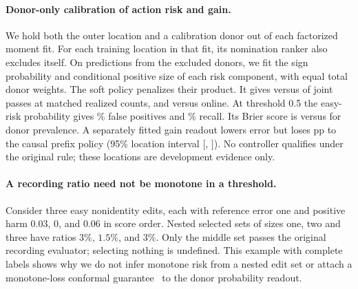 \paragraph{Donor-only calibration of action risk and gain.}
We hold both the outer location and a calibration donor out of each
factorized moment fit. For each training location in that fit, its
nomination ranker also excludes itself. On predictions from the excluded
donors, we fit the sign probability and conditional positive size of
each risk component, with equal total donor weights. The soft policy
penalizes their product. It gives \DonorReadoutMatched{} versus
\DonorReadoutMatchedFactor{} of \DonorReadoutViews{} joint passes at
matched realized counts, and \DonorReadoutOnline{} versus
\DonorReadoutOnlineFactor{} online. At threshold 0.5 the easy-risk
probability gives \DonorReadoutFpr{}\% false positives and
\DonorReadoutRecall{}\% recall. Its Brier score is \DonorReadoutBrier{}
versus \DonorReadoutPrior{} for donor prevalence. A separately fitted
gain readout lowers error but loses \DonorReadoutGain{} pp to the causal
prefix policy (95\% location interval [\DonorReadoutGainLow{},
\DonorReadoutGainHigh{}]). No controller qualifies under the original
rule; these locations are development evidence only.

\paragraph{A recording ratio need not be monotone in a threshold.}
Consider three easy nonidentity edits, each with reference error one and
positive harm $0.03$, $0$, and $0.06$ in score order. Nested selected sets
of sizes one, two and three have ratios $3\%$, $1.5\%$, and $3\%$.
Only the middle set passes the original recording evaluator; selecting
nothing is undefined. This example with complete labels shows why we do
not infer monotone risk from a nested edit set or attach a monotone-loss
conformal guarantee~\cite{crc} to the donor probability readout.
